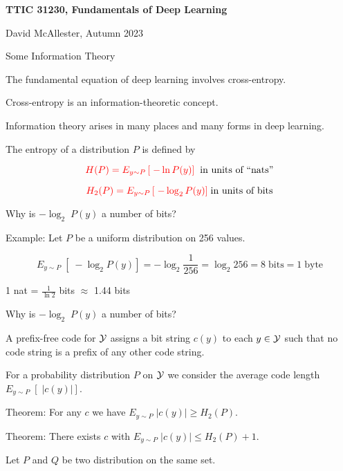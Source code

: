 




{\Huge
  \centerline{\bf TTIC 31230,  Fundamentals of Deep Learning}
  \vfill
  \centerline{David McAllester, Autumn 2023}
  \vfill
\centerline{Some Information Theory}


The fundamental equation of deep learning involves cross-entropy.

\vfill
Cross-entropy is an information-theoretic concept.

\vfill
Information theory arises in many places and many forms in deep learning.


The entropy of a distribution $P$ is defined by

\vfill
$${\color{red} H(P) = E_{y \sim P} \left[ \;- \ln P(y)\right]}\;\;\mbox{in units of ``nats''}$$

\vfill
$${\color{red} H_2(P) = E_{y \sim P}\left[ \;- \log_2 P(y)\right]}\; \mbox{in units of bits}$$


Why is $-\log_2\;P(y)$ a number of bits?

\vfill
Example: Let $P$ be a uniform distribution on 256 values.

\vfill
$$E_{y \sim P}\;\left[\;-\log_2 P(y)\right] = - \log_2 \frac{1}{256} = \log_2 256 = 8\;\mathrm{bits} = 1\;\mathrm{byte}$$

\vfill
\centerline{\color{red} 1 nat = $\frac{1}{\ln 2}$ bits $\approx$ 1.44 bits}


Why is $-\log_2\;P(y)$ a number of bits?

\vfill
A prefix-free code for ${\cal Y}$ assigns a bit string $c(y)$ to each $y \in {\cal Y}$ such that no code string is a prefix of any other code string.

\vfill
For a probability distribution $P$ on ${\cal Y}$ we consider the average code length $E_{y \sim P}\;\left[ \;|c(y)|\right]$.

\vfill
Theorem: For any $c$ we have {\color{red} $E_{y \sim P}\;|c(y)|  \geq H_2(P)$}.

\vfill
Theorem: There exists $c$ with {\color{red} $E_{y \sim P} \;|c(y)| \leq H_2(P) +1$}.


Let $P$ and $Q$ be two distribution on the same set.

}
